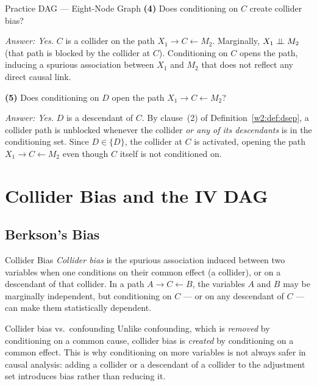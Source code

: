 \documentclass[master.tex]{subfiles}
\begin{document}
\begin{example}{Practice DAG --- Eight-Node Graph}
\medskip
\noindent\textbf{(4)} Does conditioning on $C$ create collider bias?

\noindent\emph{Answer: Yes.}
$C$ is a collider on the path $X_1 \to C \leftarrow M_2$.
Marginally, $X_1 \perp\!\!\!\perp M_2$ (that path is blocked by the collider at $C$).
Conditioning on $C$ opens the path, inducing a spurious association
between $X_1$ and $M_2$ that does not reflect any direct causal link.

\medskip
\noindent\textbf{(5)} Does conditioning on $D$ open the path $X_1 \to C \leftarrow M_2$?

\noindent\emph{Answer: Yes.}
$D$ is a descendant of $C$.  By clause~(2) of Definition~\ref{w2:def:dsep},
a collider path is unblocked whenever the collider \emph{or any of its
descendants} is in the conditioning set.
Since $D \in \{D\}$, the collider at $C$ is activated, opening the path
$X_1 \to C \leftarrow M_2$ even though $C$ itself is not conditioned on.
\end{example}

\section{Collider Bias and the IV DAG}
\label{w2:sec:ivdag}

\subsection{Berkson's Bias}

\begin{defn}{Collider Bias}
\label{w2:def:colliderbias}
\emph{Collider bias} is the spurious association induced between two
variables when one conditions on their common effect (a collider), or
on a descendant of that collider.
In a path $A \to C \leftarrow B$, the variables $A$ and $B$ may be
marginally independent, but conditioning on $C$ --- or on any descendant
of $C$ --- can make them statistically dependent.
\end{defn}

\begin{warn}{Collider bias vs.\ confounding}
Unlike confounding, which is \emph{removed} by conditioning on a common
cause, collider bias is \emph{created} by conditioning on a common
effect.
This is why conditioning on more variables is not always safer in causal
analysis: adding a collider or a descendant of a collider to the
adjustment set introduces bias rather than reducing it.
\end{warn}
\end{document}
